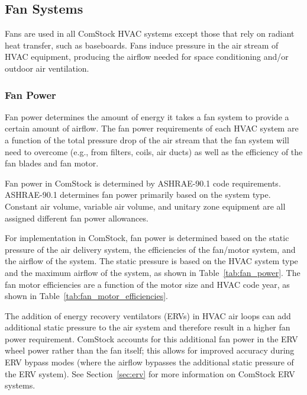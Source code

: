 \pagebreak
\subsection{Fan Systems}

Fans are used in all ComStock HVAC systems except those that rely on radiant heat transfer, such as baseboards. Fans induce pressure in the air stream of HVAC equipment, producing the airflow needed for space conditioning and/or outdoor air ventilation.

\subsubsection{Fan Power}

Fan power determines the amount of energy it takes a fan system to provide a certain amount of airflow. The fan power requirements of each HVAC system are a function of the total pressure drop of the air stream that the fan system will need to overcome (e.g., from filters, coils, air ducts) as well as the efficiency of the fan blades and fan motor.

Fan power in ComStock is determined by ASHRAE-90.1 code requirements. ASHRAE-90.1 determines fan power primarily based on the system type. Constant air volume, variable air volume, and unitary zone equipment are all assigned different fan power allowances.

For implementation in ComStock, fan power is determined based on the static pressure of the air delivery system, the efficiencies of the fan/motor system, and the airflow of the system. The static pressure is based on the HVAC system type and the maximum airflow of the system, as shown in Table~\ref{tab:fan_power}. The fan motor efficiencies are a function of the motor size and HVAC code year, as shown in Table~\ref{tab:fan_motor_efficiencies}.

The addition of energy recovery ventilators (ERVs) in HVAC air loops can add additional static pressure to the air system and therefore result in a higher fan power requirement. ComStock accounts for this additional fan power in the ERV wheel power rather than the fan itself; this allows for improved accuracy during ERV bypass modes (where the airflow bypasses the additional static pressure of the ERV system). See Section~\ref{sec:erv} for more information on ComStock ERV systems.




